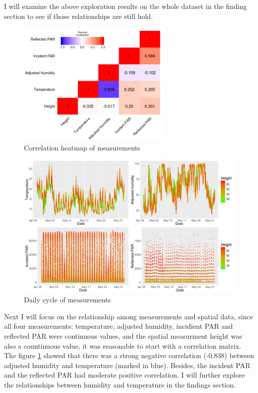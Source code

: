 \documentclass[11pt]{article}
\begin{document}
{I will examine the above exploration results on the whole dataset in the finding section to see if those relationships are still hold.\\
\begin{figure}[H]
\centering
\includegraphics [height = 170pt]{cor_mat.png}
\caption{Correlation heatmap of measurements}
\label{fig:cormat}
\end{figure}
\begin{figure}[H]
\centering
\includegraphics [width=0.95\linewidth,height=0.55\linewidth]{daily_cycle.png}
\caption{Daily cycle of measurements}
\label{fig:dailycycle}
\end{figure}
Next I will focus on the relationship among measurements and spatial data, since all four measurements: temperature, adjusted humidity, incidient PAR and reflected PAR were continuous values, and the spatial measurment height was also a countinuous value, it was reasonable to start with a correlation matrix. The figure \ref{fig:cormat} showed that there was a strong negative correlation (-0.838) between adjusted humidity and temperature (marked in blue). Besides, the incident PAR and the reflected PAR had moderate positive correlation. I will further explore the relationships between humidity and temperature in the findings section.\\
}
\end{document}
